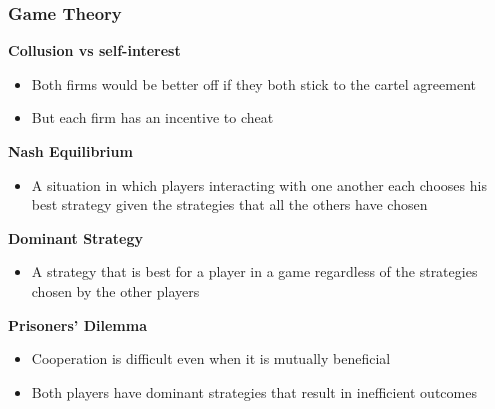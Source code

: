 \documentclass{article}
\begin{document}
\begin{multicols}{2}
\subsubsection{Game Theory}
\textbf{Collusion vs self-interest}
\begin{itemize}
	\item Both firms would be better off if they both stick to the cartel agreement
	\item But each firm has an incentive to cheat
\end{itemize}
\textbf{Nash Equilibrium}
\begin{itemize}
	\item A situation in which players interacting with one another each chooses his best strategy given the strategies that all the others have chosen
\end{itemize}
\textbf{Dominant Strategy}
\begin{itemize}
	\item A strategy that is best for a player in a game regardless of the strategies chosen by the other players
\end{itemize}
\textbf{Prisoners' Dilemma}
\begin{itemize}
	\item Cooperation is difficult even when it is mutually beneficial
	\item Both players have dominant strategies that result in inefficient outcomes
	\begin{center}
		\begin{table}[H]
\end{table}
\end{center}
\end{itemize}
\end{multicols}
\end{document}
